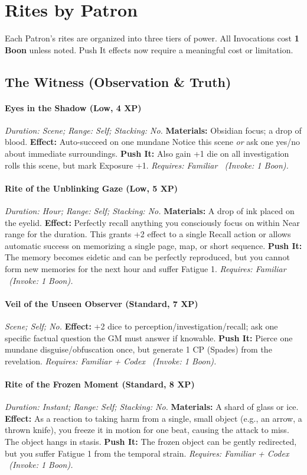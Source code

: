 \documentclass[12pt,twoside]{book}
\begin{document}
\section{Rites by Patron}
Each Patron's rites are organized into three tiers of power. All Invocations cost \textbf{1 Boon} unless noted. Push It effects now require a meaningful cost or limitation.

\subsection{The Witness (Observation \& Truth)}
\paragraph{Eyes in the Shadow (Low, 4 XP)} \emph{Duration: Scene; Range: Self; Stacking: No.}
\textbf{Materials:} Obsidian focus; a drop of blood.
\textbf{Effect:} Auto-succeed on one mundane Notice this scene \emph{or} ask one yes/no about immediate surroundings.
\textbf{Push It:} Also gain +1 die on all investigation rolls this scene, but mark Exposure +1.
\emph{Requires: Familiar \ (\textit{Invoke:} 1 Boon).}
\paragraph{Rite of the Unblinking Gaze (Low, 5 XP)} \emph{Duration: Hour; Range: Self; Stacking: No.}
\textbf{Materials:} A drop of ink placed on the eyelid.
\textbf{Effect:} Perfectly recall anything you consciously focus on within Near range for the duration. This grants +2 effect to a single Recall action or allows automatic success on memorizing a single page, map, or short sequence.
\textbf{Push It:} The memory becomes eidetic and can be perfectly reproduced, but you cannot form new memories for the next hour and suffer Fatigue 1.
\emph{Requires: Familiar \ (\textit{Invoke:} 1 Boon).}
\paragraph{Veil of the Unseen Observer (Standard, 7 XP)} \emph{Scene; Self; No.}
\textbf{Effect:} +2 dice to perception/investigation/recall; ask one specific factual question the GM must answer if knowable.
\textbf{Push It:} Pierce one mundane disguise/obfuscation once, but generate 1 CP (Spades) from the revelation.
\emph{Requires: Familiar + Codex \ (\textit{Invoke:} 1 Boon).}
\paragraph{Rite of the Frozen Moment (Standard, 8 XP)} \emph{Duration: Instant; Range: Self; Stacking: No.}
\textbf{Materials:} A shard of glass or ice.
\textbf{Effect:} As a reaction to taking harm from a single, small object (e.g., an arrow, a thrown knife), you freeze it in motion for one beat, causing the attack to miss. The object hangs in stasis.
\textbf{Push It:} The frozen object can be gently redirected, but you suffer Fatigue 1 from the temporal strain.
\emph{Requires: Familiar + Codex \ (\textit{Invoke:} 1 Boon).}
\end{document}
